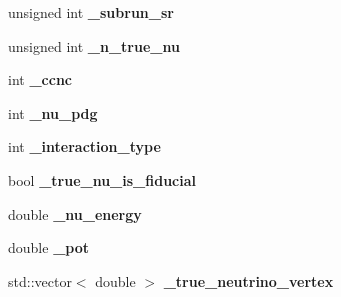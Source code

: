 \begin{DoxyCompactItemize}
\item 
\hypertarget{classlee_1_1ElectronNeutrinoFilter_a4c94603539c2385aa2506873642f4d10}{unsigned int {\bfseries \-\_\-subrun\-\_\-sr}}\label{classlee_1_1ElectronNeutrinoFilter_a4c94603539c2385aa2506873642f4d10}

\item 
\hypertarget{classlee_1_1ElectronNeutrinoFilter_a4f05be9559cb86c6cc44777f084bac9e}{unsigned int {\bfseries \-\_\-n\-\_\-true\-\_\-nu}}\label{classlee_1_1ElectronNeutrinoFilter_a4f05be9559cb86c6cc44777f084bac9e}

\item 
\hypertarget{classlee_1_1ElectronNeutrinoFilter_ad81983f8dff6ebf659accd8bcf9cd592}{int {\bfseries \-\_\-ccnc}}\label{classlee_1_1ElectronNeutrinoFilter_ad81983f8dff6ebf659accd8bcf9cd592}

\item 
\hypertarget{classlee_1_1ElectronNeutrinoFilter_a94d49a87b7b626a8c752ad333094a8a0}{int {\bfseries \-\_\-nu\-\_\-pdg}}\label{classlee_1_1ElectronNeutrinoFilter_a94d49a87b7b626a8c752ad333094a8a0}

\item 
\hypertarget{classlee_1_1ElectronNeutrinoFilter_ac8d699e9d44882c88e543548d5937405}{int {\bfseries \-\_\-interaction\-\_\-type}}\label{classlee_1_1ElectronNeutrinoFilter_ac8d699e9d44882c88e543548d5937405}

\item 
\hypertarget{classlee_1_1ElectronNeutrinoFilter_a6cf1bb1a9189ea476599097e31bdb517}{bool {\bfseries \-\_\-true\-\_\-nu\-\_\-is\-\_\-fiducial}}\label{classlee_1_1ElectronNeutrinoFilter_a6cf1bb1a9189ea476599097e31bdb517}

\item 
\hypertarget{classlee_1_1ElectronNeutrinoFilter_aef727e4de42995c92b6f679c2134e2d0}{double {\bfseries \-\_\-nu\-\_\-energy}}\label{classlee_1_1ElectronNeutrinoFilter_aef727e4de42995c92b6f679c2134e2d0}

\item 
\hypertarget{classlee_1_1ElectronNeutrinoFilter_afafabcd6b8132be5b9140806c1edff7c}{double {\bfseries \-\_\-pot}}\label{classlee_1_1ElectronNeutrinoFilter_afafabcd6b8132be5b9140806c1edff7c}

\item 
\hypertarget{classlee_1_1ElectronNeutrinoFilter_a472e49172a8e61052ca8b41dbf718a1e}{std\-::vector$<$ double $>$ {\bfseries \-\_\-true\-\_\-neutrino\-\_\-vertex}}\label{classlee_1_1ElectronNeutrinoFilter_a472e49172a8e61052ca8b41dbf718a1e}


\end{DoxyCompactItemize}
